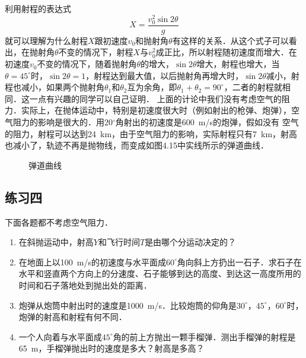 利用射程的表达式
\[X=\frac{v_0^2\sin 2\theta}{g} \]
就可以理解为什么射程$X$跟初速度$v_0$和抛射角$\theta$有这样的关系．从这个式子可以看出，在抛射角$\theta$不变的情况下，射程$X$与$v^2_0$成正比，所以射程随初速度而增大．在初速度$v_0$不变的情况下，随着抛射角$\theta$的增大，$\sin 2\theta$增大，射程也增大，当$\theta=45^{\circ}$时，$\sin 2\theta=1$，射程达到最大值，以后抛射角再增大时，$\sin 2\theta$减小，射程也减小，如果两个抛射角$\theta_1$和$\theta_2$互为余角，即$\theta_1+\theta_2=90^\circ$，二者的射程就相同．这一点有兴趣的同学可以自己证明．
\newpage
上面的计论中我们没有考虑空气的阻力．实际上，在抛体运动中，特别是初速度很大时（例如射出的枪弹、炮弹），空气阻力的影响是很大的．用20$^\circ$角射出的初速度是\SI{600}{m/s}的炮弹，假如没有 空气的阻力，射程可以达到\SI{24}{km}，由于空气阻力的影响，实际射程只有\SI{7}{km}，射高也减小了，轨迹不再是抛物线，而变成如图4.15中实线所示的弹道曲线．
\begin{figure}[H]
    \centering
    \caption{弹道曲线}
\end{figure}

\subsection*{练习四}
下面各题都不考虑空气阻力．
\begin{enumerate}
    \item 在斜抛运动中，射高$Y$和飞行时间$T$是由哪个分运动决定的？
    \item 在地面上以\SI{100}{m/s}的初速度与水平面成$60^\circ$角向斜上方扔出一石子．求石子在水平和竖直两个方向上的分速度、石子能够到达的高度、到达这一高度所用的时间和石子落地处到抛出处的距离．
    \item 炮弹从炮筒中射出时的速度是\SI{1000}{m/s}．比较炮筒的仰角是$30^\circ$，$45^\circ$，$60^\circ$时，炮弹的射高和射程有何不同．
    \item 一个人向着与水平面成$45^\circ$角的前上方抛出一颗手榴弹．测出手榴弹的射程是\SI{65}{m}，手榴弹抛出时的速度是多大？射高是多高？
\end{enumerate}
\newpage
